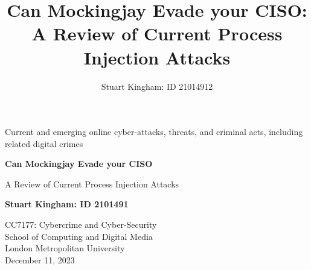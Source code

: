 \documentclass{article}
\title{Can Mockingjay Evade your CISO: A Review of Current Process Injection Attacks}
\author{Stuart Kingham: ID 21014912}
\begin{document}
\doublespacing



\begin{titlepage}
  \vspace*{\fill}
  \begin{center}
       \vspace*{1cm}

       {\LARGE Current and emerging online cyber-attacks, threats, and criminal acts, including related digital crimes}

       \vspace*{1cm}
       {\large \textbf{ Can Mockingjay Evade your CISO}}
       
       \vspace{0.2cm}
       {\large A Review of Current Process Injection Attacks}
            

       \vfill

       \textbf{Stuart Kingham: ID 2101491}

       \vfill
                        
       \vspace{0.8cm}
     

       CC7177: Cybercrime and Cyber-Security\\
       School of Computing and Digital Media\\
       London Metropolitan University\\
       December 11, 2023
            
  \end{center}
  \vspace*{\fill}
\end{titlepage}

\pagebreak
\end{document}

